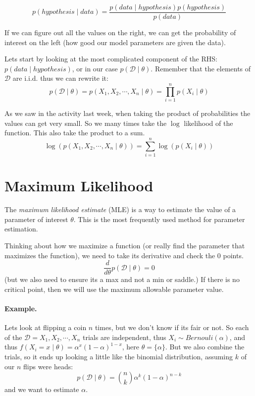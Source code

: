 \[p(hypothesis \mid data) = \frac{p(data \mid hypothesis) p(hypothesis)}{p(data)}\]

If we can figure out all the values on the right, we can get the probability of interest on the left 
(how good our model parameters are given the data).  

Lets start by looking at the most complicated component of the RHS: $p(data \mid hypothesis)$, 
or in our case $p(\mathcal{D} \mid \theta)$. 
Remember that the elements of $\mathcal{D}$ are i.i.d. thus we can rewrite it: 
\[p(\mathcal{D} \mid \theta) = p(X_1,X_2,\cdots,X_n\mid\theta) = \prod_{i=1}^n p(X_i \mid \theta)\]

\begin{aside}
As we saw in the activity last week, when taking the product of probabilities the values can get very small. 
So we many times take the $\log$ likelihood of the function. 
This also take the product to a sum. 
\[ \log(p(X_1,X_2,\cdots,X_n\mid\theta)) = \sum_{i=1}^n \log(p(X_i \mid \theta))\]
\end{aside}

\section{Maximum Likelihood}
The \emph{maximum likelihood estimate} (MLE) is a way to estimate the value of a parameter of interest $\theta$.
This is the most frequently used method for parameter estimation. 

Thinking about how we maximize a function (or really find the parameter that maximizes the function), 
we need to take its derivative and check the $0$ points. 
\[\frac{d}{d\theta}p(\mathcal{D}\mid \theta)=0\]
(but we also need to ensure its a max and not a min or saddle.)
If there is no critical point, then we will use the maximum allowable parameter value. 

\paragraph{Example. }
Lets look at flipping a coin $n$ times, but we don't know if its fair or not. 
So each of the $\mathcal{D} = X_1, X_2, \cdots, X_n$ trials are independent, 
thus $X_i \sim Bernouli(\alpha)$, and thus $f(X_i=x\mid\theta)=\alpha^x(1-\alpha)^{1-x}$, 
here $\theta = \{\alpha\}$. 
But we also combine the trials, so it ends up looking a little like the binomial distribution, 
assuming $k$ of our $n$ flips were heads: 
\[p(\mathcal{D}\mid\theta) = {n \choose k} \alpha^k(1-\alpha)^{n-k}\]
and we want to estimate $\alpha$. 

